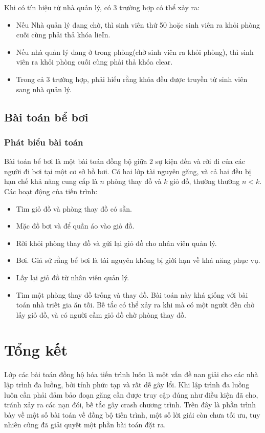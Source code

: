 \documentclass[12pt]{article}
\begin{document}
		Khi có tín hiệu từ nhà quản lý, có 3 trường hợp có thể xảy ra:
		\begin{itemize}
		\item Nếu Nhà quản lý đang chờ, thì sinh viên thứ 50 hoặc sinh viên ra khỏi phòng cuối cùng phải thả khóa lieIn.
		\item Nếu nhà quản lý đang ở trong phòng(chờ sinh viên ra khỏi phòng), thì sinh viên ra khỏi phòng cuối cùng phải thả khóa clear. 
		\item Trong cả 3 trường hợp, phải hiểu rằng khóa đều được truyền từ sinh viên sang nhà quản lý.
		\end{itemize} 
	\subsection{Bài toán bể bơi}
	\subsubsection{Phát biểu bài toán}
	Bài toán bể bơi là một bài toán đồng bộ giữa 2 sự kiện đến và rời đi của các người đi bơi tại một cơ sở hồ bơi. Có hai lớp tài nguyên găng, và cả hai đều bị hạn chế khả năng cung cấp là $n$ phòng thay đồ và $k$ giỏ đồ, thường thường $n < k$.\\
	Các hoạt động của tiến trình:
	\begin{itemize}
	\item Tìm giỏ đồ và phòng thay đồ có sẵn.
	\item Mặc đồ bơi và để quần áo vào giỏ đồ.
	\item Rời khỏi phòng thay đồ và gửi lại giỏ đồ cho nhân viên quản lý.
	\item Bơi. Giả sử rằng bể bơi là tài nguyên không bị giới hạn về khả năng phục vụ.
	\item Lấy lại giỏ đồ từ nhân viên quản lý.
	\item Tìm một phòng thay đồ trống và thay đồ.
	Bài toán này khá giống với bài toán nhà triết gia ăn tối. Bế tắc có thể xảy ra khi mà có một người đến chờ lấy giỏ đồ, và có người cầm giỏ đồ chờ phòng thay đồ.
	
	\end{itemize}
	
	
\section{Tổng kết}
Lớp các bài toán đồng hộ hóa tiến trình luôn là một vấn đề nan giải cho các nhà lập trình đa luồng, bởi tính phức tạp và rất dễ gây lổi. Khi lập trình đa luồng luôn cần phải đảm bảo đoạn găng cần được truy cập đúng như điều kiện đã cho, tránh xảy ra các nạn đói, bế tắc gây crash chương trình. Trên đây là phần trình bày về một số bài toán về đồng bộ tiến trình, một số lời giải còn chưa tối ưu, tuy nhiên cũng đã giải quyết một phần bài toán đặt ra.
\end{document}
